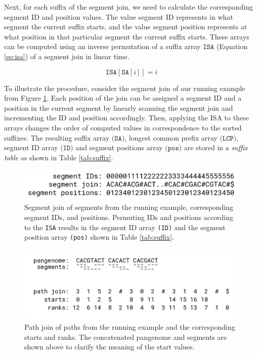 Next, for each suffix of the segment join, we need to calculate the corresponding segment ID and position values.
The value segment ID represents in what segment the current suffix starts, and the value segment position represents at what position in that particular segment the current suffix starts.
These arrays can be computed using an inverse permutation of a suffix array $\texttt{ISA}$ (Equation \ref{eq:isa}) of a segment join in linear time.

\begin{equation}
    \label{eq:isa}
    \texttt{ISA}[\texttt{SA}[i]] = i
\end{equation}

To illustrate the procedure, consider the segment join of our running example from Figure \ref{fig:ids_and_positions}.
Each position of the join can be assigned a segment ID and a position in the current segment by linearly scanning the segment join and incrementing the ID and position accordingly.
Then, applying the ISA to these arrays changes the order of computed values in correspondence to the sorted suffixes.
The resulting suffix array $\texttt{(SA)}$, longest common prefix array $\texttt{(LCP)}$, segment ID array $\texttt{(ID)}$ and segment positions array $\texttt{(pos)}$ are stored in a \emph{suffix table} as shown in Table \ref{tab:suffix}.

\begin{figure}
    \centering
    \includegraphics[width=\linewidth]{images/ids_and_positions.png}
    \caption{
        Segment join of segments from the running example, corresponding segment IDs, and positions. Permuting IDs and positions according to the \texttt{ISA} results in the segment ID array \texttt{(ID)} and the segment position array \texttt{(pos)} shown in Table \ref{tab:suffix}. \label{fig:ids_and_positions}
    }
\end{figure}





\begin{figure}
    \centering
    \includegraphics[width=\linewidth]{images/path_join.png}
    \caption{
    Path join of paths from the running example and the corresponding starts and ranks. The concatenated pangenome and segments are shown above to clarify the meaning of the start values. \label{fig:path_join}
    }
\end{figure}

